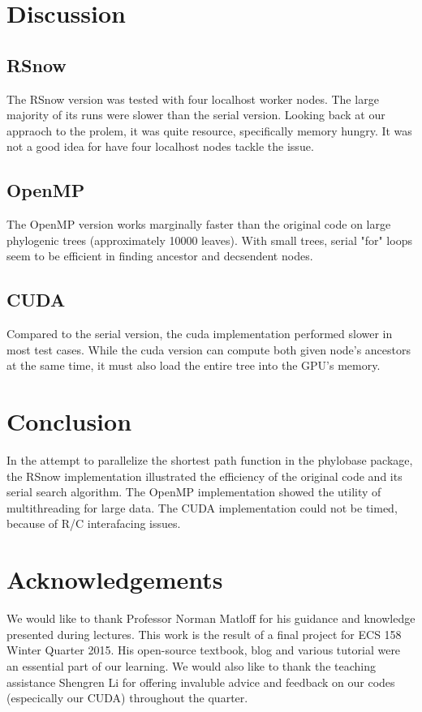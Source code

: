 \documentclass[11pt,letterpaper]{article}
\begin{document}
\section{Discussion}

\subsection{RSnow}
The RSnow version was tested with four localhost worker nodes. The large majority of its runs were slower than the serial version. Looking back at our appraoch to the prolem, it was quite resource, specifically memory hungry. It was not a good idea for have four localhost nodes tackle the issue. \\

\subsection{OpenMP}
The OpenMP version works marginally faster than the original code on large phylogenic trees (approximately 10000 leaves). With small trees, serial "for" loops seem to be efficient in finding ancestor and decsendent nodes. \\

\subsection{CUDA}

Compared to the serial version, the cuda implementation performed slower in most test cases. While the cuda version can compute both given node’s ancestors at the same time, it must also load the entire tree into the GPU’s memory.\\


\section{Conclusion}
In the attempt to parallelize the shortest path function in the phylobase package, the RSnow implementation illustrated the efficiency of the original code and its serial search algorithm. The OpenMP implementation showed the utility of multithreading for large data. The CUDA implementation could not be timed, because of R/C interafacing issues. 


\section{Acknowledgements}
We would like to thank Professor Norman Matloff for his guidance and knowledge presented during lectures. This work is the result of a final project for ECS 158 Winter Quarter 2015.  His open-source textbook, blog and various tutorial were an essential part of our learning. We would also like to thank the teaching assistance Shengren Li for offering invaluble advice and feedback on our codes (especically our CUDA) throughout the quarter.
\end{document}

